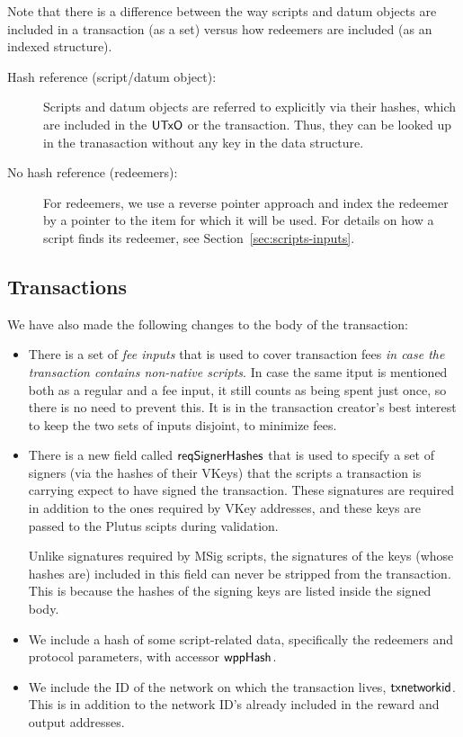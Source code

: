 Note that there is a difference between the way scripts and datum objects are included in
a transaction (as a set) versus how redeemers are included
(as an indexed structure).

\begin{description}
\item
  [Hash reference (script/datum object):]
  Scripts and datum objects are referred to explicitly via their hashes,
  which are included in the $\mathsf{UTxO}$ or the transaction. Thus, they can be
  looked up in the tranasaction without any key in the data structure.

  \item[No hash reference (redeemers):] For redeemers,
  we use a reverse pointer approach and
  index the redeemer by a pointer to the item for which it will be used.
  For details on how a script finds its redeemer, see Section~\ref{sec:scripts-inputs}.
\end{description}

\subsection{Transactions}
We have also made the following changes to
the body of the transaction:

\begin{itemize}
  \item There is a set of \emph{fee inputs} that is used to cover transaction fees
    \emph{in case the transaction contains non-native scripts}. In case the same itput is mentioned both as
    a regular and a fee input, it still counts as being spent just once, so there is no need to prevent this.
    It is in the transaction creator's best interest to keep the two sets of inputs disjoint, to minimize fees.
  \item There is a new field called $\mathsf{reqSignerHashes}$ that is used to specify a set of signers (via the
    hashes of their VKeys) that the scripts a transaction is carrying expect to have signed the transaction.
    These signatures are required in addition to the ones required by VKey addresses, and
    these keys are passed to the Plutus scipts during validation.

    Unlike signatures required by MSig scripts, the signatures of the keys
    (whose hashes are) included
    in this field can never be stripped from the transaction. This is because
    the hashes of the signing keys are listed inside the signed body.
  \item We include a hash of some script-related data, specifically the redeemers and protocol parameters,
    with accessor $\mathsf{wppHash}$.

  \item We include the ID of the network on which the transaction lives, $\mathsf{txnetworkid}$.
  This is in addition to the network ID's already included in the reward and output addresses.
\end{itemize}

